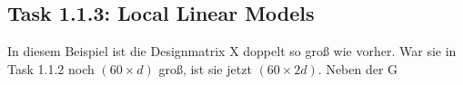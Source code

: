 \subsection{Task 1.1.3: Local Linear Models}

In diesem Beispiel ist die Designmatrix X doppelt so groß wie vorher. War sie in Task 1.1.2 noch $(60 \times d)$ groß, ist sie jetzt $(60 \times 2d)$. Neben der G


